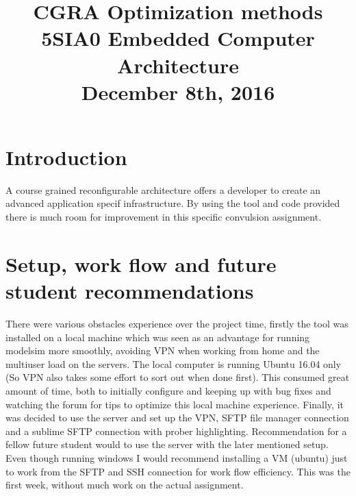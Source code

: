 \documentclass[10pt]{IEEEtran}
\begin{document}
\title{CGRA Optimization methods\\ {\fontsize{13}{0}\selectfont 5SIA0 Embedded Computer Architecture} \\ {\fontsize{13}{0}\selectfont December 8th, 2016}}

\author{\IEEEauthorblockN{}
}

\maketitle

\IEEEpeerreviewmaketitle

\section{Introduction}

A course grained reconfigurable architecture offers a developer to create an advanced application specif infrastructure. By using the tool and code provided there is much room for improvement in this specific convulsion assignment. 

\section{Setup, work flow and future student recommendations}

There were various obstacles experience over the project time, firstly the tool was installed on a local machine which was seen as an advantage for running modelsim more smoothly, avoiding VPN when working from home and the multiuser load on the servers. The local computer is running Ubuntu 16.04 only (So VPN also takes some effort to sort out when done first). This consumed great amount of time, both to initially configure and keeping up with bug fixes and watching the forum for tips to optimize this local machine experience. Finally, it was decided to use the server and set up the VPN, SFTP file manager connection and a sublime SFTP connection with prober highlighting. Recommendation for a fellow future student would to use the server with the later mentioned setup. Even though running windows I would recommend installing a VM (ubuntu) just to work from the SFTP and SSH connection for work flow efficiency. This was the first week, without much work on the actual assignment.
\end{document}
